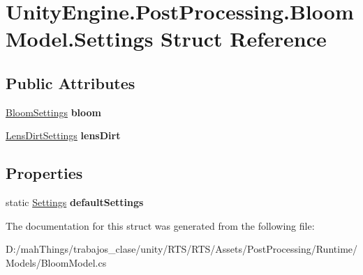 \hypertarget{struct_unity_engine_1_1_post_processing_1_1_bloom_model_1_1_settings}{}\section{Unity\+Engine.\+Post\+Processing.\+Bloom\+Model.\+Settings Struct Reference}
\label{struct_unity_engine_1_1_post_processing_1_1_bloom_model_1_1_settings}
\subsection*{Public Attributes}
\begin{DoxyCompactItemize}
\item 
\mbox{\label{struct_unity_engine_1_1_post_processing_1_1_bloom_model_1_1_settings_a67ea8696d631446369685adfd283cc6a}} 
\mbox{\hyperlink{struct_unity_engine_1_1_post_processing_1_1_bloom_model_1_1_bloom_settings}{Bloom\+Settings}} {\bfseries bloom}
\item 
\mbox{\label{struct_unity_engine_1_1_post_processing_1_1_bloom_model_1_1_settings_a5da17f7be340ea4ea3b7bcde312d5953}} 
\mbox{\hyperlink{struct_unity_engine_1_1_post_processing_1_1_bloom_model_1_1_lens_dirt_settings}{Lens\+Dirt\+Settings}} {\bfseries lens\+Dirt}
\end{DoxyCompactItemize}
\subsection*{Properties}
\begin{DoxyCompactItemize}
\item 
\mbox{\label{struct_unity_engine_1_1_post_processing_1_1_bloom_model_1_1_settings_a97ac6c2e2540e9df3929e0fc0d754aa7}} 
static \mbox{\hyperlink{struct_unity_engine_1_1_post_processing_1_1_bloom_model_1_1_settings}{Settings}} {\bfseries default\+Settings}
\end{DoxyCompactItemize}


The documentation for this struct was generated from the following file\+:\begin{DoxyCompactItemize}
\item 
D\+:/mah\+Things/trabajos\+\_\+clase/unity/\+R\+T\+S/\+R\+T\+S/\+Assets/\+Post\+Processing/\+Runtime/\+Models/Bloom\+Model.\+cs\end{DoxyCompactItemize}
